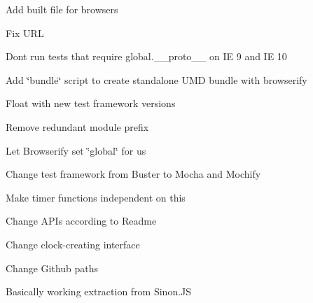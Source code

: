 \begin{DoxyItemize}
\item Add built file for browsers
\item Fix U\+RL
\item Don\textquotesingle{}t run tests that require global.\+\_\+\+\_\+proto\+\_\+\+\_\+ on IE 9 and IE 10
\item Add \char`\"{}bundle\char`\"{} script to create standalone U\+MD bundle with browserify
\item Float with new test framework versions
\item Remove redundant module prefix
\item Let Browserify set \char`\"{}global\char`\"{} for us
\item Change test framework from Buster to Mocha and Mochify
\item Make timer functions independent on {\ttfamily this}
\item Change A\+P\+Is according to Readme
\item Change clock-\/creating interface
\item Change Github paths
\item Basically working extraction from Sinon.\+JS 
\end{DoxyItemize}